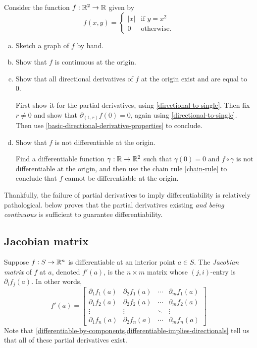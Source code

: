 \begin{exercise} \label{directionals-and-linear-dont-imply-differentiable}
	Consider the function $f : \mathbb{R}^2 \to \mathbb{R}$ given by
	\[ f(x,y) = \begin{cases} |x| & \text{if } y = x^2 \\ 0 & \text{otherwise}. \end{cases} \]
	\begin{enumerate}[(a)]
		\item Sketch a graph of $f$ by hand.
		\item Show that $f$ is continuous at the origin. 
		\item Show that all directional derivatives of $f$ at the origin exist and are equal to 0. 
		\begin{hint}
			First show it for the partial derivatives, using \cref{directional-to-single}. Then fix $r \neq 0$ and show that $\partial_{(1,r)}f(0) = 0$, again using \cref{directional-to-single}. Then use \cref{basic-directional-derivative-properties} to conclude. 
		\end{hint}
		\item Show that $f$ is not differentiable at the origin.
		\begin{hint}
			Find a differentiable function $\gamma : \mathbb{R} \to \mathbb{R}^2$ such that $\gamma(0) = 0$ and $f \circ \gamma$ is not differentiable at the origin, and then use the chain rule \ref{chain-rule} to conclude that $f$ cannot be differentiable at the origin. 
		\end{hint}
	\end{enumerate} 
\end{exercise}

Thankfully, the failure of partial derivatives to imply differentiability is relatively pathological.  below proves that the partial derivatives existing \emph{and being continuous} is sufficient to guarantee differentiability. 


\subsection{Jacobian matrix}

\begin{definition}  
	Suppose $f : S \to \mathbb{R}^n$ is differentiable at an interior point $a \in S$. The \emph{Jacobian matrix} of $f$ at $a$, denoted $f'(a)$, is the $n \times m$ matrix whose $(j, i)$-entry is $\partial_i f_j(a)$. In other words,
	\[ f'(a) = \begin{bmatrix} \partial_1 f_1(a) & \partial_2 f_1(a) & \dotsb & \partial_m f_1(a) \\ 
	\partial_1 f_2(a) & \partial_2 f_2(a) & \dotsb & \partial_m f_2(a) \\
	\vdots & \vdots & \ddots & \vdots \\ 
	\partial_1 f_n(a) & \partial_2 f_n(a) & \dotsb & \partial_m f_n(a) \end{bmatrix} \]
	Note that \cref{differentiable-by-components,differentiable-implies-directionals} tell us that all of these partial derivatives exist. 
\end{definition}

